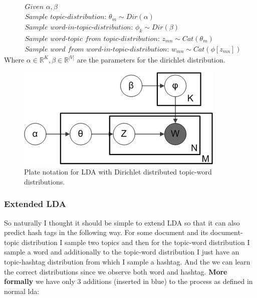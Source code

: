 \documentclass[10pt,conference,compsocconf]{IEEEtran}
\newcommand\R{\mathbb{R}}
\begin{document}
\small
\begin{align*}
&\textit{Given } \alpha, \beta \\
&\textit{Sample topic-distribution: } \theta_m \sim Dir(\alpha)\\
&\textit{Sample word-in-topic-distribution: } \phi_k \sim Dir(\beta) \\
&\textit{Sample word-topic from topic-distribution: } z_{mn} \sim Cat(\theta_m) \\
&\textit{Sample word from word-in-topic-distribution: } w_{mn} \sim Cat(\phi[z_{mn}])
\end{align*}
\normalsize
Where $\alpha \in \R^K, \beta \in \R^{|V|}$ are the parameters for the dirichlet distribution. 

\begin{figure}
	\centering
	\includegraphics[width=0.7\linewidth]{images/lda_plate}
	\caption{Plate notation for LDA with Dirichlet distributed topic-word distributions.}
	\label{fig:ldaplate}
\end{figure}


\subsubsection{Extended LDA}
So naturally I thought it should be simple to extend LDA so that it can also predict hash tags in the following way. For some document and its document-topic distribution I sample two topics and then for the topic-word distribution I sample a word and additionally to the topic-word distribution I just have an topic-hashtag distribution from which I sample a hashtag. And the we can learn the correct distributions since we observe both word and hashtag. \textbf{More formally} we have only 3 additions (inserted in blue) to the process as defined in normal lda: 
\end{document}
